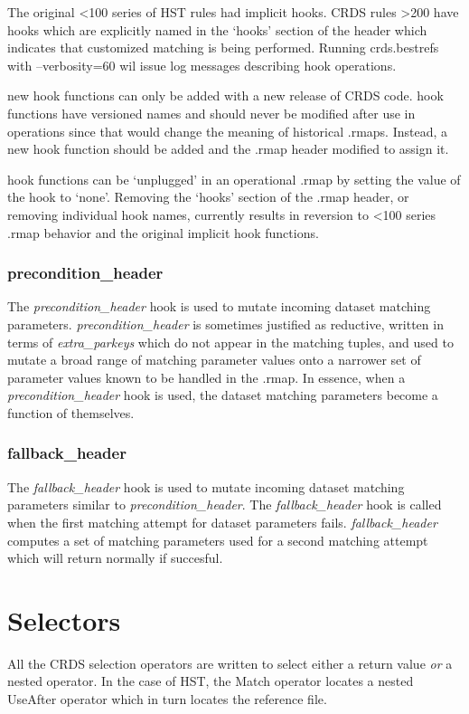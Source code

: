 \documentclass[letterpaper,10pt,english]{sphinxmanual}
\begin{document}
The original \textless{}100 series of HST rules had implicit hooks.  CRDS rules \textgreater{}200 have hooks which are explicitly
named in the `hooks' section of the header which indicates that customized matching is being performed.   Running
crds.bestrefs with --verbosity=60 wil issue log messages describing hook operations.

new hook functions can only be added with a new release of CRDS code.   hook functions have versioned names and should
never be modified after use in operations since that would change the meaning of historical .rmaps.  Instead,  a new
hook function should be added and the .rmap header modified to assign it.

hook functions can be `unplugged' in an operational .rmap by setting the value of the hook to `none'.  Removing the
`hooks' section of the .rmap header, or removing individual hook names, currently results in reversion to \textless{}100 series
.rmap behavior and the original implicit hook functions.


\subsubsection{precondition\_header}
\label{rmap_syntax:precondition-header}
The \emph{precondition\_header} hook is used to mutate incoming dataset matching parameters.   \emph{precondition\_header} is
sometimes justified as reductive,  written in terms of \emph{extra\_parkeys} which do not appear in the matching tuples,
and used to mutate a broad range of matching parameter values onto a narrower set of parameter values known to be
handled in the .rmap.   In essence,  when a \emph{precondition\_header} hook is used,  the dataset matching parameters
become a function of themselves.


\subsubsection{fallback\_header}
\label{rmap_syntax:fallback-header}
The \emph{fallback\_header} hook is used to mutate incoming dataset matching parameters similar to \emph{precondition\_header}.
The \emph{fallback\_header} hook is called when the first matching attempt for dataset parameters fails.  \emph{fallback\_header}
computes a set of matching parameters used for a second matching attempt which will return normally if succesful.


\section{Selectors}
\label{rmap_syntax:selectors}
All the CRDS selection operators are written to select either a return
value \emph{or} a nested operator.  In the case of HST, the Match operator locates a
nested UseAfter operator which in turn locates the reference file.
\end{document}
